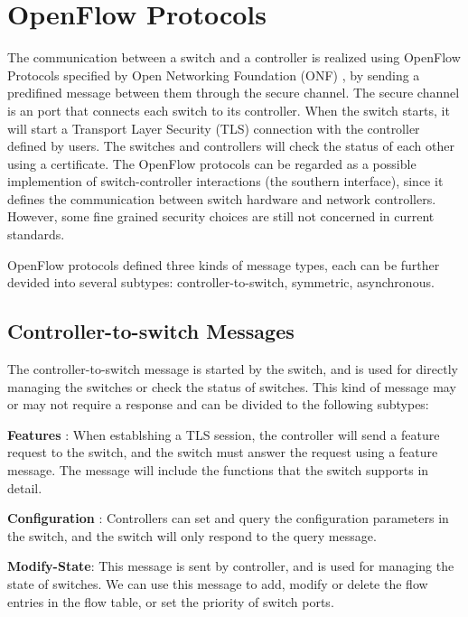 \section{OpenFlow Protocols}
\label{sec:OpenFlow Protocols}

The communication between a switch and a controller is realized using OpenFlow Protocols specified by Open Networking Foundation (ONF) \cite{onf}, by sending a predifined message between them through the secure channel. The secure channel is an port that connects each switch to its controller. When the switch starts, it will start a Transport Layer Security (TLS) connection with the controller defined by users. The switches and controllers will check the status of each other using a certificate. The OpenFlow protocols can be regarded as a possible implemention of switch-controller interactions (the southern interface), since it defines the communication between switch hardware and network controllers. However, some fine grained security choices are still not concerned in current standards.

OpenFlow protocols defined three kinds of message types, each can be further devided into several subtypes: controller-to-switch, symmetric, asynchronous. 

\subsection{Controller-to-switch Messages}
\label{sec:Controller-to-switch Messages}

The controller-to-switch message is started by the switch, and is used for directly managing the switches or check the status of switches. This kind of message may or may not require a response and can be divided to the following subtypes:

\textbf{Features} : When establshing a TLS session, the controller will send a feature request to the switch, and the switch must answer the request using a feature message. The message will include the functions that the switch supports in detail.

\textbf{Configuration} : Controllers can set and query the configuration parameters in the switch, and the switch will only respond to the query message.

\textbf{Modify-State}: This message is sent by controller, and is used for managing the state of switches. We can use this message to add, modify or delete the flow entries in the flow table, or set the priority of switch ports. 

